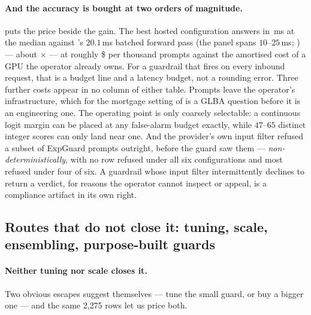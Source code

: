 \documentclass[11pt]{article}
\begin{document}
\paragraph{And the accuracy is bought at two orders of magnitude.} 
puts the price beside the gain. The best hosted configuration answers in \FrontierBestMedianMs{}\,ms
at the median against \FrontierBestBaseName's $20.1$\,ms batched forward pass (the panel spans
$10$--$25$\,ms; ) --- about \FrontierSlowdown$\times$ --- at roughly
\$\FrontierBestCost{} per thousand prompts against
the amortised cost of a GPU the operator already owns. For a guardrail that fires on every inbound
request, that is a budget line and a latency budget, not a rounding error. Three further costs
appear in no column of either table. Prompts leave the operator's infrastructure, which for the
mortgage setting of  is a GLBA question before it is an engineering one.
The operating point is only coarsely selectable: a continuous logit margin can be placed at any
false-alarm budget exactly, while $47$--$65$ distinct integer scores can only land near one.
And the provider's own input filter refused a subset of ExpGuard prompts outright, before the
guard saw them --- \emph{non-deterministically}, with no row refused under all six configurations
and most refused under four of six. A guardrail whose input filter intermittently declines to
return a verdict, for reasons the operator cannot inspect or appeal, is a compliance artifact in
its own right.


\subsection{Routes that do not close it: tuning, scale, ensembling, purpose-built guards}
\label{sec:frontier-routes}
\paragraph{Neither tuning nor scale closes it.} Two obvious escapes suggest themselves ---
tune the small guard, or buy a bigger one --- and the same 2{,}275 rows let us price both.
\end{document}
